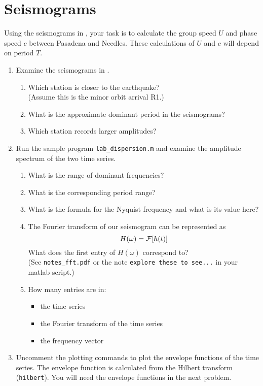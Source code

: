 \documentclass[11pt,titlepage,fleqn]{article}
\newcommand{\fft}{h}
\newcommand{\ffw}{H}
\begin{document}

\section{Seismograms}

Using the seismograms in , your task is to calculate the group speed $U$ and phase speed $c$ between Pasadena and Needles. These calculations of $U$ and $c$ will depend on period $T$.

\begin{enumerate}
\item Examine the seismograms in .
%
\begin{enumerate}
\item Which station is closer to the earthquake? \\
(Assume this is the minor orbit arrival R1.)
\item What is the approximate dominant period in the seismograms?
\item Which station records larger amplitudes?
\end{enumerate}

\item Run the sample program \verb+lab_dispersion.m+ and examine the amplitude spectrum of the two time series. 
%
\begin{enumerate}
\item What is the range of dominant frequencies?
\item What is the corresponding period range?
\item What is the formula for the Nyquist frequency and what is its value here?
\item The Fourier transform of our seismogram can be represented as
%
\begin{equation*}
\ffw(\omega) = \cF[\fft(t)]
\end{equation*}
%
What does the first entry of $\ffw(\omega)$ correspond to? \\
(See \verb+notes_fft.pdf+ or the note \verb+explore these to see...+ in your matlab script.)
\item How many entries are in:
\begin{itemize}
\item the time series
\item the Fourier transform of the time series
\item the frequency vector
\end{itemize}
\end{enumerate}

\item Uncomment the plotting commands to plot the envelope functions of the time series. The envelope function is calculated from the Hilbert transform (\verb+hilbert+). You will need the envelope functions in the next problem.

\end{enumerate}
\end{document}
